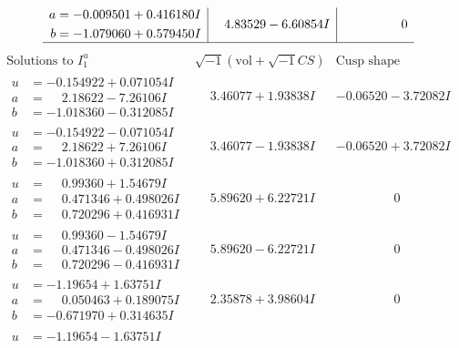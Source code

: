 \documentclass[1p]{elsarticle_modified}
\theoremstyle{definition}
\newcommand{\I}{\sqrt{-1}}
\begin{document}
$$\begin{array}{c|c|c}
\begin{aligned}
a &= -0.009501 + 0.416180 I \\
b &= -1.079060 + 0.579450 I\end{aligned}
 & \phantom{-}4.83529 - 6.60854 I & \phantom{-0.000000 } 0\\
 \hline 
 \end{array}$$\newpage$$\begin{array}{c|c|c}  
\text{Solutions to }I^u_{1}& \I (\text{vol} + \sqrt{-1}CS) & \text{Cusp shape}\\
 \hline 
\begin{aligned}
u &= -0.154922 + 0.071054 I \\
a &= \phantom{-}2.18622 - 7.26106 I \\
b &= -1.018360 - 0.312085 I\end{aligned}
 & \phantom{-}3.46077 + 1.93838 I & -0.06520 - 3.72082 I \\ \hline\begin{aligned}
u &= -0.154922 - 0.071054 I \\
a &= \phantom{-}2.18622 + 7.26106 I \\
b &= -1.018360 + 0.312085 I\end{aligned}
 & \phantom{-}3.46077 - 1.93838 I & -0.06520 + 3.72082 I \\ \hline\begin{aligned}
u &= \phantom{-}0.99360 + 1.54679 I \\
a &= \phantom{-}0.471346 + 0.498026 I \\
b &= \phantom{-}0.720296 + 0.416931 I\end{aligned}
 & \phantom{-}5.89620 + 6.22721 I & \phantom{-0.000000 } 0 \\ \hline\begin{aligned}
u &= \phantom{-}0.99360 - 1.54679 I \\
a &= \phantom{-}0.471346 - 0.498026 I \\
b &= \phantom{-}0.720296 - 0.416931 I\end{aligned}
 & \phantom{-}5.89620 - 6.22721 I & \phantom{-0.000000 } 0 \\ \hline\begin{aligned}
u &= -1.19654 + 1.63751 I \\
a &= \phantom{-}0.050463 + 0.189075 I \\
b &= -0.671970 + 0.314635 I\end{aligned}
 & \phantom{-}2.35878 + 3.98604 I & \phantom{-0.000000 } 0 \\ \hline\begin{aligned}
u &= -1.19654 - 1.63751 I \\

\end{aligned}
\end{array}$$
\end{document}
